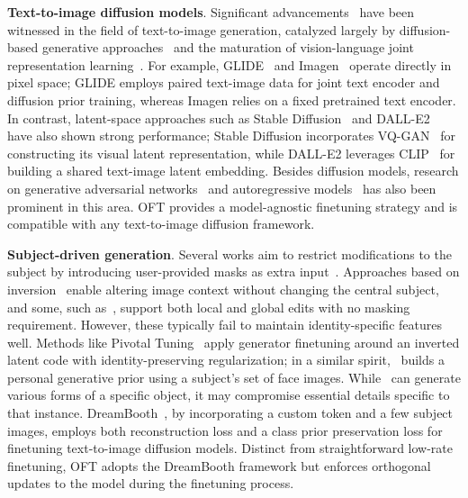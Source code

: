 \textbf{Text-to-image diffusion models}. Significant advancements~\cite{saharia2022photorealistic,ramesh2022hierarchical,rombach2022high,gu2022vector,nichol2022glide} have been witnessed in the field of text-to-image generation, catalyzed largely by diffusion-based generative approaches~\cite{ho2020denoising,song2021score,song2021denoising,dhariwal2021diffusion} and the maturation of vision-language joint representation learning~\cite{su2020vlbert,lu2019vilbert,radford2021learning,wang2021simvlm,li2022blip,li2023blip,alayrac2022flamingo,schuhmann2022laion}. For example, GLIDE~\cite{nichol2022glide} and Imagen~\cite{saharia2022photorealistic} operate directly in pixel space; GLIDE employs paired text-image data for joint text encoder and diffusion prior training, whereas Imagen relies on a fixed pretrained text encoder. In contrast, latent-space approaches such as Stable Diffusion~\cite{rombach2022high} and DALL-E2~\cite{ramesh2022hierarchical} have also shown strong performance; Stable Diffusion incorporates VQ-GAN~\cite{esser2021taming} for constructing its visual latent representation, while DALL-E2 leverages CLIP~\cite{radford2021learning} for building a shared text-image latent embedding. Besides diffusion models, research on generative adversarial networks~\cite{reed2016generative,zhang2017stackgan,xu2018attngan,li2019controllable} and autoregressive models~\cite{ramesh2021zero,ding2021cogview,wu2022nuwa,yuscaling} has also been prominent in this area. OFT provides a model-agnostic finetuning strategy and is compatible with any text-to-image diffusion framework.

\textbf{Subject-driven generation}. Several works aim to restrict modifications to the subject by introducing user-provided masks as extra input~\cite{avrahami2022blended,nichol2022glide}. Approaches based on inversion~\cite{choi2021ilvr,dhariwal2021diffusion,ramesh2022hierarchical,gal2022image} enable altering image context without changing the central subject, and some, such as~\cite{hertz2022prompt}, support both local and global edits with no masking requirement. However, these typically fail to maintain identity-specific features well. Methods like Pivotal Tuning~\cite{roich2022pivotal} apply generator finetuning around an inverted latent code with identity-preserving regularization; in a similar spirit,~\cite{nitzan2022mystyle} builds a personal generative prior using a subject’s set of face images. While~\cite{casanova2021instance} can generate various forms of a specific object, it may compromise essential details specific to that instance. DreamBooth~\cite{ruiz2023dreambooth}, by incorporating a custom token and a few subject images, employs both reconstruction loss and a class prior preservation loss for finetuning text-to-image diffusion models. Distinct from straightforward low-rate finetuning, OFT adopts the DreamBooth framework but enforces orthogonal updates to the model during the finetuning process.

